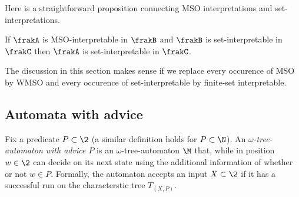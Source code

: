 Here is a straightforward proposition connecting MSO interpretations and set-interpretations.

\begin{lemma}
If $\frakA$ is MSO-interpretable in $\frakB$ and $\frakB$ is set-interpretable
in $\frakC$ then $\frakA$ is set-interpretable in $\frakC$.  
\end{lemma}

The discussion in this section makes sense if we replace every occurence of MSO
by WMSO and every occurence of set-interpretable by finite-set interpretable.

\subsection{Automata with advice}
Fix a predicate $P \subset \2$ (a similar definition holds for $P \subset \N$).
An {\em $\omega$-tree-automaton with advice $P$} is an $\omega$-tree-automaton $\M$ that, while in
position $w \in \2$ can decide on its next state using the additional
information of whether or not $w \in P$. Formally, the automaton accepts an
input $X \subset \2$ if it has a successful run on the characterstic tree $T_{(X,P)}$.


\fi
